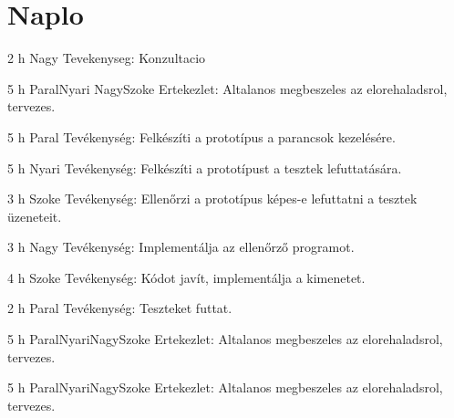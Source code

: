 \section{Naplo}
\begin{naplo}

            
            {2 h}
            {Nagy}
            {Tevekenyseg: Konzultacio}

            {5 h}
            {Paral\newline  Nyari \newline Nagy\newline Szoke}
            {Ertekezlet: Altalanos megbeszeles az elorehaladsrol, tervezes.}

            {5 h}
            {Paral}
            {Tevékenység: Felkészíti a prototípus a parancsok kezelésére.}

            {5 h}
            {Nyari}
            {Tevékenység: Felkészíti a prototípust a tesztek lefuttatására.}

            {3 h}
            {Szoke}
            {Tevékenység: Ellenőrzi a prototípus képes-e lefuttatni a tesztek üzeneteit.}

            {3 h}
            {Nagy}
            {Tevékenység: Implementálja az ellenőrző programot.}

            {4 h}
            {Szoke}
            {Tevékenység: Kódot javít, implementálja a kimenetet.}

            {2 h}
            {Paral}
            {Tevékenység: Teszteket futtat.}

            {5 h}
            {Paral\newline Nyari\newline Nagy\newline Szoke}
            {Ertekezlet: Altalanos megbeszeles az elorehaladsrol, tervezes.}

            {5 h}
            {Paral\newline Nyari\newline Nagy\newline Szoke}
            {Ertekezlet: Altalanos megbeszeles az elorehaladsrol, tervezes.}


\end{naplo}
